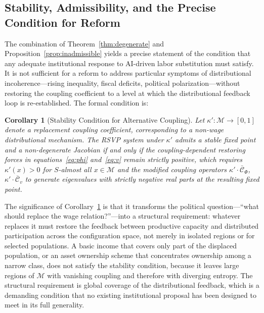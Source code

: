 \documentclass[11pt, a4paper]{article}
\theoremstyle{plain}
\newtheorem{corollary}[theorem]{Corollary}
\theoremstyle{definition}
\newcommand{\Sfield}{S}
\newcommand{\statespace}{\mathcal{M}}
\newcommand{\coupling}{\kappa}
\begin{document}
\subsection{Stability, Admissibility, and the Precise Condition for Reform}

The combination of Theorem~\ref{thm:degenerate} and
Proposition~\ref{prop:inadmissible} yields a precise statement of the
condition that any adequate institutional response to AI-driven labor
substitution must satisfy. It is not sufficient for a reform to address
particular symptoms of distributional incoherence---rising inequality, fiscal
deficits, political polarization---without restoring the coupling coefficient
to a level at which the distributional feedback loop is re-established. The
formal condition is:

\begin{corollary}[Stability Condition for Alternative Coupling]
\label{cor:stability}
Let $\coupling' : \statespace \to [0,1]$ denote a replacement coupling
coefficient, corresponding to a non-wage distributional mechanism. The RSVP
system under $\coupling'$ admits a stable fixed point and a non-degenerate
Jacobian if and only if the coupling-dependent restoring forces in
equations~\eqref{eq:phi} and~\eqref{eq:v} remain strictly positive, which
requires $\coupling'(x) > 0$ for $\Sfield$-almost all $x \in \statespace$ and
the modified coupling operators $\coupling' \cdot \bar{\mathcal{C}}_\Phi$,
$\coupling' \cdot \bar{\mathcal{C}}_v$ to generate eigenvalues with strictly
negative real parts at the resulting fixed point.
\end{corollary}

The significance of Corollary~\ref{cor:stability} is that it transforms the
political question---``what should replace the wage relation?''---into a
structural requirement: whatever replaces it must restore the feedback between
productive capacity and distributed participation across the configuration
space, not merely in isolated regions or for selected populations. A basic
income that covers only part of the displaced population, or an asset ownership
scheme that concentrates ownership among a narrow class, does not satisfy the
stability condition, because it leaves large regions of $\statespace$ with
vanishing coupling and therefore with diverging entropy. The structural
requirement is global coverage of the distributional feedback, which is a
demanding condition that no existing institutional proposal has been designed
to meet in its full generality.
\end{document}

